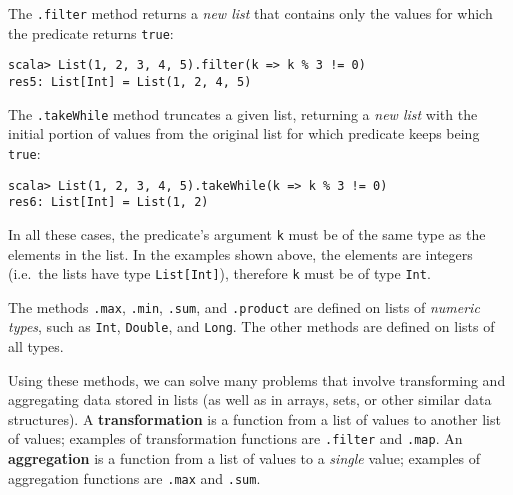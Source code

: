 The \lstinline!.filter!
method returns a \emph{new list} that contains only the values for
which the predicate returns \texttt{}\lstinline!true!:

\begin{lstlisting}
scala> List(1, 2, 3, 4, 5).filter(k => k % 3 != 0)
res5: List[Int] = List(1, 2, 4, 5)
\end{lstlisting}
The \texttt{}\lstinline!.takeWhile!
method truncates a given list, returning a \emph{new list} with the
initial portion of values from the original list for which predicate
keeps being \lstinline!true!:
\begin{lstlisting}
scala> List(1, 2, 3, 4, 5).takeWhile(k => k % 3 != 0)
res6: List[Int] = List(1, 2)
\end{lstlisting}
In all these cases, the predicate's argument \lstinline!k!
must be of the same type as the elements in the list. In the examples
shown above, the elements are integers (i.e.\ the lists have type
\lstinline!List[Int]!),
therefore \texttt{}\lstinline!k!
must be of type \lstinline!Int!.

The methods \lstinline!.max!,
\lstinline!.min!, \lstinline!.sum!,
and \texttt{}\lstinline!.product!
are defined on lists of \emph{numeric types}, such as \lstinline!Int!,
\lstinline!Double!, and
\lstinline!Long!. The other
methods are defined on lists of all types.

Using these methods, we can solve many problems that involve transforming
and aggregating data stored in lists (as well as in arrays, sets,
or other similar data structures). A \textbf{transformation}
is a function from a list of values to another list of values; examples
of transformation functions are \texttt{}\lstinline!.filter!
and \lstinline!.map!. An
\textbf{aggregation} is a function from a list
of values to a \emph{single} value; examples of aggregation functions
are \texttt{}\lstinline!.max!
and \lstinline!.sum!.

